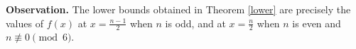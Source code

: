 \documentclass{article}
\newcommand{\blue}[1]{\textcolor{blue}{#1}}
\def\greeen{\textcolor[RGB]{47, 141, 26 }}
\begin{document}






\medskip

\noindent
\textbf{Observation.} The lower bounds obtained in Theorem \ref{lower} are precisely the values of $f(x)$ at
$x=\frac{n-1}{2}$
when $n$ is odd, and at $x=\frac{n}{2}$
when $n$ is even and $n\not\equiv0\pmod{6}$.

\end{document}
